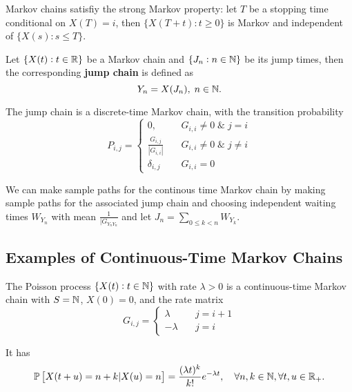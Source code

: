 \begin{theorem}
    Markov chains satisfiy the strong Markov property: let $T$ be a stopping time conditional on $X(T) = i$, then $\{ X(T + t) : t \ge 0 \}$ is Markov and independent of $\{X(s): s \le T\}$.
\end{theorem}

\begin{definition}
    Let $\{X(t):t\in\mathbb{R}\}$ be a Markov chain and $\{J_n : n \in \mathbb{N}\}$ be its jump times, then the corresponding \textbf{jump chain} is defined as 
    \begin{equation*}
        Y_n = X(J_n), \; n\in\mathbb{N}.
    \end{equation*}
\end{definition}
\begin{proposition}
    The jump chain is a discrete-time Markov chain, with the transition probability
    \begin{equation*}
        P_{i,j} = \begin{cases}
            0, \quad & G_{i,i} \neq 0 \; \& \; j = i \\ 
            \frac{G_{i,j}}{|G_{i,i}|} \quad & G_{i,i} \neq 0 \; \& \; j \neq i \\ 
            \delta_{i,j} \quad & G_{i,i} = 0
        \end{cases}
    \end{equation*}
\end{proposition}

\begin{remark}
    We can make sample paths for the continous time Markov chain by making sample paths for the associated jump chain and choosing independent waiting times $W_{Y_n}$ with mean $\frac{1}{|G_{Y_n Y_n}}$ and let $J_n = \sum_{0 \le k <n} W_{Y_k}$.
\end{remark}

\subsection{Examples of Continuous-Time Markov Chains}

\begin{example}
    The Poisson process $\{X(t): t \in \mathbb{N}\}$ with rate $\lambda > 0$ is a continuous-time Markov chain with $S = \mathbb{N}$, $X(0) = 0$, and the rate matrix
    \begin{equation*}
        G_{i,j} = 
        \begin{cases}
            \lambda \quad & j = i+1 \\ 
            -\lambda \quad & j = i
        \end{cases}
    \end{equation*}

    It has 
    \begin{equation*}
        \mathbb{P} \left[ X(t+u) = n+k | X(u) = n \right] = \frac{(\lambda t)^k}{k!} e^{-\lambda t}, \quad \forall n, k \in \mathbb{N}, \forall t, u \in \mathbb{R}_+.
    \end{equation*}
\end{example}

